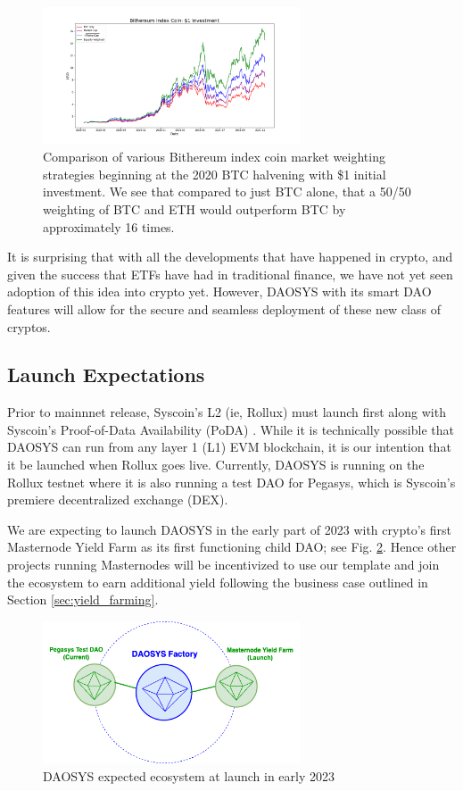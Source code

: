 \documentclass[journal,twocolumn,12pt]{ieeesyscoin}
\begin{document}
\begin{figure}[h!]
\includegraphics[width=3in]{img/index_coin.png}
\caption{Comparison of various Bithereum index coin market weighting strategies beginning at the 2020 BTC halvening with \$1 initial investment. We see that compared to just BTC alone, that a 50/50 weighting of BTC and ETH would outperform BTC by approximately 16 times.} 
\label{fig:crypto_index}
\end{figure} 

It is surprising that with all the developments that have happened in crypto, and given the success that ETFs have had in traditional finance, we have not yet seen adoption of this idea into crypto yet. However, DAOSYS with its smart DAO features will allow for the secure and seamless deployment of these new class of cryptos.  

\subsection{Launch Expectations}

Prior to mainnnet release, Syscoin's L2 (ie, Rollux) \cite{ROL22, Sig21a, Sig21b} must launch first along with Syscoin's Proof-of-Data Availability (PoDA) \cite{PODA22}. While it is technically possible that DAOSYS can run from any layer 1 (L1) EVM blockchain, it is our intention that it be launched when Rollux goes live. Currently, DAOSYS is running on the Rollux testnet where it is also running a test DAO for Pegasys, which is Syscoin's premiere decentralized exchange (DEX). 

We are expecting to launch DAOSYS in the early part of 2023 with crypto's first Masternode Yield Farm as its first functioning child DAO; see Fig. \ref{fig:daosys_launch}. Hence other projects running Masternodes will be incentivized to use our template and join the ecosystem to earn additional yield following the business case outlined in Section \ref{sec:yield_farming}.

\begin{figure}[h!]
\includegraphics[width=3in]{img/daosys_launch.png}
\caption{DAOSYS expected ecosystem at launch in early 2023} 
\label{fig:daosys_launch}
\end{figure} 
\end{document}
